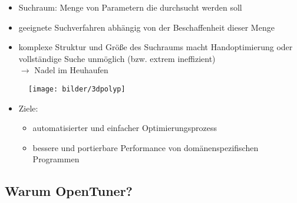 
    \begin{frame}
    
    \begin{itemize}
      \item Suchraum: Menge von Parametern die durchsucht werden soll
      \item geeignete Suchverfahren abhängig von der Beschaffenheit dieser Menge
      \item komplexe Struktur und Größe des Suchraums macht Handoptimierung oder vollständige Suche
      unmöglich (bzw. extrem ineffizient) \\ $\rightarrow$ Nadel im Heuhaufen
    \end{itemize}
      
    \begin{figure}[ht]
      \centering	      
      \texttt{[image: bilder/3dpolyp]}
      \label{3dpoly}
    \end{figure}
    
    \begin{itemize}
      \item Ziele:
      \begin{itemize}
        \item automatisierter und einfacher Optimierungsprozess
        \item bessere und portierbare Performance von domänenspezifischen Programmen
      \end{itemize}
    \end{itemize}

    \end{frame}
    
    \subsection{Warum OpenTuner?}
    
      
